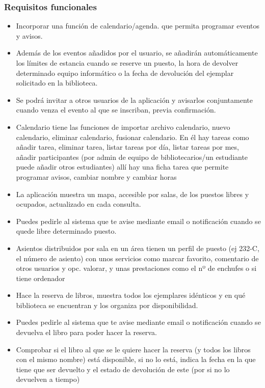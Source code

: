 \documentclass[12pt]{article}
\begin{document}
\subsubsection{Requisitos funcionales}
\begin{itemize}[noitemsep]
\item Incorporar una función de calendario/agenda. que permita programar eventos y avisos.
\item Además de los eventos añadidos por el usuario, se añadirán automáticamente los límites de estancia cuando se reserve un puesto, la hora de devolver determinado equipo informático o la fecha de devolución del ejemplar solicitado en la biblioteca.
\item Se podrá invitar a otros usuarios de la aplicación y avisarlos conjuntamente cuando venza el evento al que se inscriban, previa confirmación.
\item Calendario tiene las funciones de importar archivo calendario, nuevo calendario, eliminar calendario, fusionar calendario. En él hay tareas como añadir tarea, eliminar tarea, listar tareas por día, listar tareas por mes, añadir participantes (por admin de equipo de bibliotecarios/un estudiante puede añadir otros estudiantes) allí hay una ficha tarea que permite programar avisos, cambiar nombre y cambiar horas
\item La aplicación muestra un mapa, accesible  por salas, de los puestos libres y ocupados, actualizado en cada consulta.
\item Puedes pedirle al sistema que te avise mediante email o notificación cuando se quede libre determinado puesto.
\item Asientos distribuidos por sala en un área tienen un perfil de puesto (ej 232-C, el número de asiento) con unos servicios como marcar favorito, comentario de otros usuarios y opc. valorar, y unas prestaciones como el nº de enchufes o si tiene ordenador
\item Hace la reserva de libros, muestra todos los ejemplares idénticos y en qué biblioteca se encuentran y los organiza por disponibilidad.
\item Puedes pedirle al sistema que te avise mediante email o notificación cuando se devuelva el libro para poder hacer la reserva. 
\item Comprobar si el libro al que se le quiere hacer la reserva (y todos los libros con el mismo nombre) está disponible, si no lo está, indica la fecha en la que tiene que ser devuelto y el estado de devolución de este (por si no lo devuelven a tiempo)

\end{itemize}
\end{document}
